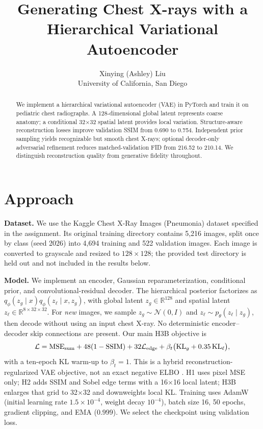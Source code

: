 \documentclass{article}
\title{Generating Chest X-rays with a Hierarchical Variational Autoencoder}
\author{Xinying (Ashley) Liu\\University of California, San Diego}
\begin{document}
\maketitle
\begin{abstract}
We implement a hierarchical variational autoencoder (VAE) in PyTorch and train it on pediatric chest radiographs. A 128-dimensional global latent represents coarse anatomy; a conditional 32$\times$32 spatial latent provides local variation. Structure-aware reconstruction losses improve validation SSIM from 0.690 to 0.754. Independent prior sampling yields recognizable but smooth chest X-rays; optional decoder-only adversarial refinement reduces matched-validation FID from 216.52 to 210.14. We distinguish reconstruction quality from generative fidelity throughout.
\end{abstract}

\section{Approach}
\textbf{Dataset.} We use the Kaggle Chest X-Ray Images (Pneumonia) dataset specified in the assignment. Its original training directory contains 5,216 images, split once by class (seed 2026) into 4,694 training and 522 validation images. Each image is converted to grayscale and resized to $128\times128$; the provided test directory is held out and not included in the results below.

\textbf{Model.} We implement an encoder, Gaussian reparameterization, conditional prior, and convolutional-residual decoder. The hierarchical posterior factorizes as $q_\phi(z_g\mid x)q_\phi(z_\ell\mid x,z_g)$, with global latent $z_g\in\mathbb R^{128}$ and spatial latent $z_\ell\in\mathbb R^{8\times32\times32}$. For \emph{new} images, we sample $z_g\sim\mathcal N(0,I)$ and $z_\ell\sim p_\theta(z_\ell\mid z_g)$, then decode without using an input chest X-ray. No deterministic encoder--decoder skip connections are present. Our main H3B objective is
\begin{equation}
\mathcal L=\mathrm{MSE}_{\rm sum}+48(1-\mathrm{SSIM})+32\mathcal L_{\rm edge}
+\beta_t\bigl(\mathrm{KL}_g+0.35\,\mathrm{KL}_\ell\bigr),
\end{equation}
with a ten-epoch KL warm-up to $\beta_t=1$. This is a hybrid reconstruction-regularized VAE objective, not an exact negative ELBO \citep{kingma2014auto}. H1 uses pixel MSE only; H2 adds SSIM and Sobel edge terms with a 16$\times$16 local latent; H3B enlarges that grid to 32$\times$32 and downweights local KL. Training uses AdamW (initial learning rate $1.5\times10^{-4}$, weight decay $10^{-4}$), batch size 16, 50 epochs, gradient clipping, and EMA ($0.999$). We select the checkpoint using validation loss.
\end{document}
